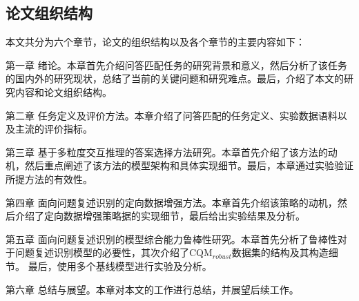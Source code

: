 \subsection{论文组织结构}

本文共分为六个章节，论文的组织结构以及各个章节的主要内容如下：

第一章 \quad 绪论。本章首先介绍问答匹配任务的研究背景和意义，然后分析了该任务的国内外的研究现状，总结了当前的关键问题和研究难点。最后，介绍了本文的研究内容和论文组织结构。

第二章 \quad 任务定义及评价方法。本章介绍了问答匹配的任务定义、实验数据语料以及主流的评价指标。

第三章 \quad 基于多粒度交互推理的答案选择方法研究。本章首先介绍了该方法的动机，然后重点阐述了该方法的模型架构和具体实现细节。最后，本章通过实验验证所提方法的有效性。

第四章 \quad 面向问题复述识别的定向数据增强方法。本章首先介绍该策略的动机，然后介绍了定向数据增强策略据的实现细节，最后给出实验结果及分析。

第五章 \quad 面向问题复述识别的模型综合能力鲁棒性研究。本章首先分析了鲁棒性对于问题复述识别模型的必要性，其次介绍了CQM$_{robust}$数据集的结构及其构造细节。
最后，使用多个基线模型进行实验及分析。

第六章 \quad 总结与展望。本章对本文的工作进行总结，并展望后续工作。



